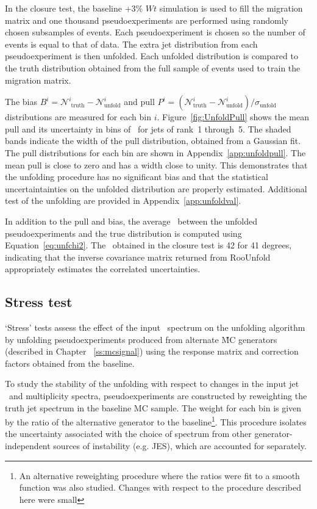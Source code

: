 In the closure test, the baseline \ttbar+3\% $Wt$ simulation is used to fill the migration matrix and
one thousand pseudoexperiments are performed using randomly chosen subsamples of events.  Each pseudoexperiment is chosen
so the number of events is equal to that of data. 
The extra jet distribution from each pseudoexperiment is then unfolded.  Each unfolded distribution is 
compared to the truth distribution obtained from the full sample of events used to train the migration matrix. 

The bias $B^i={\mathscr N}^i_{\textrm{ truth}}-{\mathscr N}^i_{\textrm{unfold}}$ and 
pull $P^i=({\mathscr N}^i_{\textrm{truth}}-{\mathscr N}^i_{\textrm{unfold}})/\sigma_{\textrm {unfold}}$ 
distributions are measured for each bin $i$. 
Figure~\ref{fig:UnfoldPull} shows the mean pull and its uncertainty in bins of \pT\ for jets of rank~1 through~5.  The shaded bands indicate
the width of the pull distribution, obtained from a Gaussian fit.
The pull distributions for each bin are shown in Appendix~\ref{app:unfoldpull}. 
The mean pull is close to zero and has a width close to unity.  This demonstrates that the unfolding procedure has no 
significant bias and that the statistical uncertaintainties on the unfolded distribution are properly estimated. Additional test of the unfolding are provided in Appendix~\ref{app:unfoldval}. 

In addition to the pull and bias, the average \chisq\ between the unfolded pseudoexperiments and the true distribution is computed using Equation~\ref{eq:unfchi2}.  The \chisq\ obtained in the closure test is 42 for 41 degrees, indicating that the
inverse covariance matrix returned from RooUnfold appropriately estimates the correlated uncertainties. 

\subsection{Stress test}
\label{ss:stress}
`Stress' tests assess the effect of the input \pt\ spectrum on the unfolding algorithm by unfolding pseudoexperiments produced from alternate \ttbar\~MC generators (described in Chapter ~\ref{ss:mcsignal}) using the response matrix and correction factors
obtained from the baseline. 

To study the stability of the unfolding with respect to changes in the input jet \pt\ and multiplicity spectra, pseudoexperiments are constructed by reweighting the truth jet spectrum in the baseline MC sample. The weight for each bin is given by the ratio of the alternative generator to the baseline\footnote{An alternative reweighting procedure where the ratios were fit to a smooth function was also studied. Changes with respect to the procedure described here were small}. This procedure isolates the uncertainty associated with the choice of spectrum from other generator-independent sources of instability (e.g. JES), which are accounted for separately. %

